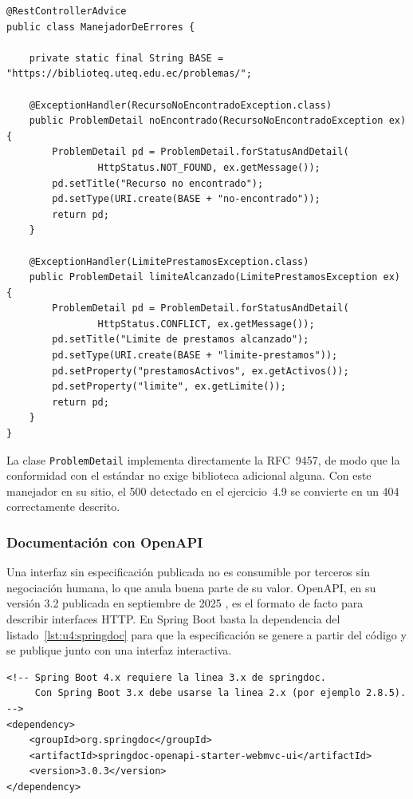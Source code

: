 \documentclass[11pt,a4paper,openany]{book}
\begin{document}
\begin{lstlisting}[style=java,caption={Manejador global que traduce excepciones de dominio a detalles de problema.},label={lst:u4:advice}]
@RestControllerAdvice
public class ManejadorDeErrores {

	private static final String BASE = "https://biblioteq.uteq.edu.ec/problemas/";

	@ExceptionHandler(RecursoNoEncontradoException.class)
	public ProblemDetail noEncontrado(RecursoNoEncontradoException ex) {
		ProblemDetail pd = ProblemDetail.forStatusAndDetail(
				HttpStatus.NOT_FOUND, ex.getMessage());
		pd.setTitle("Recurso no encontrado");
		pd.setType(URI.create(BASE + "no-encontrado"));
		return pd;
	}

	@ExceptionHandler(LimitePrestamosException.class)
	public ProblemDetail limiteAlcanzado(LimitePrestamosException ex) {
		ProblemDetail pd = ProblemDetail.forStatusAndDetail(
				HttpStatus.CONFLICT, ex.getMessage());
		pd.setTitle("Limite de prestamos alcanzado");
		pd.setType(URI.create(BASE + "limite-prestamos"));
		pd.setProperty("prestamosActivos", ex.getActivos());
		pd.setProperty("limite", ex.getLimite());
		return pd;
	}
}
\end{lstlisting}

La clase \texttt{ProblemDetail} implementa directamente la RFC~9457, de modo que la conformidad con el estándar no exige biblioteca adicional alguna. Con este manejador en su sitio, el 500 detectado en el ejercicio~4.9 se convierte en un 404 correctamente descrito.

\subsubsection{Documentación con OpenAPI}

Una interfaz sin especificación publicada no es consumible por terceros sin negociación humana, lo que anula buena parte de su valor. OpenAPI, en su versión 3.2 publicada en septiembre de 2025 \cite{oai2025oas32}, es el formato de facto para describir interfaces HTTP. En Spring Boot basta la dependencia del listado~\ref{lst:u4:springdoc} para que la especificación se genere a partir del código y se publique junto con una interfaz interactiva.

\begin{lstlisting}[style=xml,caption={Dependencia que habilita la generacion automatica de la especificacion.},label={lst:u4:springdoc}]
<!-- Spring Boot 4.x requiere la linea 3.x de springdoc.
     Con Spring Boot 3.x debe usarse la linea 2.x (por ejemplo 2.8.5). -->
<dependency>
	<groupId>org.springdoc</groupId>
	<artifactId>springdoc-openapi-starter-webmvc-ui</artifactId>
	<version>3.0.3</version>
</dependency>
\end{lstlisting}
\end{document}
